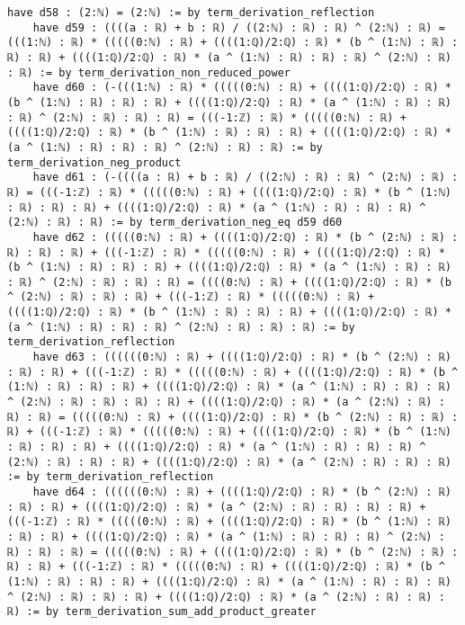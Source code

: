 \documentclass{article}
\begin{document}
\begin{tcolorbox}[colback=white!10, width=\linewidth]
\begin{lstlisting}[language=Lean4]
    have d58 : (2:ℕ) = (2:ℕ) := by term_derivation_reflection
    have d59 : ((((a : ℝ) + b : ℝ) / ((2:ℕ) : ℝ) : ℝ) ^ (2:ℕ) : ℝ) = (((1:ℕ) : ℝ) * (((((0:ℕ) : ℝ) + ((((1:ℚ)/2:ℚ) : ℝ) * (b ^ (1:ℕ) : ℝ) : ℝ) : ℝ) + ((((1:ℚ)/2:ℚ) : ℝ) * (a ^ (1:ℕ) : ℝ) : ℝ) : ℝ) ^ (2:ℕ) : ℝ) : ℝ) := by term_derivation_non_reduced_power
    have d60 : (-(((1:ℕ) : ℝ) * (((((0:ℕ) : ℝ) + ((((1:ℚ)/2:ℚ) : ℝ) * (b ^ (1:ℕ) : ℝ) : ℝ) : ℝ) + ((((1:ℚ)/2:ℚ) : ℝ) * (a ^ (1:ℕ) : ℝ) : ℝ) : ℝ) ^ (2:ℕ) : ℝ) : ℝ) : ℝ) = (((-1:ℤ) : ℝ) * (((((0:ℕ) : ℝ) + ((((1:ℚ)/2:ℚ) : ℝ) * (b ^ (1:ℕ) : ℝ) : ℝ) : ℝ) + ((((1:ℚ)/2:ℚ) : ℝ) * (a ^ (1:ℕ) : ℝ) : ℝ) : ℝ) ^ (2:ℕ) : ℝ) : ℝ) := by term_derivation_neg_product
    have d61 : (-((((a : ℝ) + b : ℝ) / ((2:ℕ) : ℝ) : ℝ) ^ (2:ℕ) : ℝ) : ℝ) = (((-1:ℤ) : ℝ) * (((((0:ℕ) : ℝ) + ((((1:ℚ)/2:ℚ) : ℝ) * (b ^ (1:ℕ) : ℝ) : ℝ) : ℝ) + ((((1:ℚ)/2:ℚ) : ℝ) * (a ^ (1:ℕ) : ℝ) : ℝ) : ℝ) ^ (2:ℕ) : ℝ) : ℝ) := by term_derivation_neg_eq d59 d60
    have d62 : (((((0:ℕ) : ℝ) + ((((1:ℚ)/2:ℚ) : ℝ) * (b ^ (2:ℕ) : ℝ) : ℝ) : ℝ) : ℝ) + (((-1:ℤ) : ℝ) * (((((0:ℕ) : ℝ) + ((((1:ℚ)/2:ℚ) : ℝ) * (b ^ (1:ℕ) : ℝ) : ℝ) : ℝ) + ((((1:ℚ)/2:ℚ) : ℝ) * (a ^ (1:ℕ) : ℝ) : ℝ) : ℝ) ^ (2:ℕ) : ℝ) : ℝ) : ℝ) = ((((0:ℕ) : ℝ) + ((((1:ℚ)/2:ℚ) : ℝ) * (b ^ (2:ℕ) : ℝ) : ℝ) : ℝ) + (((-1:ℤ) : ℝ) * (((((0:ℕ) : ℝ) + ((((1:ℚ)/2:ℚ) : ℝ) * (b ^ (1:ℕ) : ℝ) : ℝ) : ℝ) + ((((1:ℚ)/2:ℚ) : ℝ) * (a ^ (1:ℕ) : ℝ) : ℝ) : ℝ) ^ (2:ℕ) : ℝ) : ℝ) : ℝ) := by term_derivation_reflection
    have d63 : ((((((0:ℕ) : ℝ) + ((((1:ℚ)/2:ℚ) : ℝ) * (b ^ (2:ℕ) : ℝ) : ℝ) : ℝ) + (((-1:ℤ) : ℝ) * (((((0:ℕ) : ℝ) + ((((1:ℚ)/2:ℚ) : ℝ) * (b ^ (1:ℕ) : ℝ) : ℝ) : ℝ) + ((((1:ℚ)/2:ℚ) : ℝ) * (a ^ (1:ℕ) : ℝ) : ℝ) : ℝ) ^ (2:ℕ) : ℝ) : ℝ) : ℝ) : ℝ) + ((((1:ℚ)/2:ℚ) : ℝ) * (a ^ (2:ℕ) : ℝ) : ℝ) : ℝ) = (((((0:ℕ) : ℝ) + ((((1:ℚ)/2:ℚ) : ℝ) * (b ^ (2:ℕ) : ℝ) : ℝ) : ℝ) + (((-1:ℤ) : ℝ) * (((((0:ℕ) : ℝ) + ((((1:ℚ)/2:ℚ) : ℝ) * (b ^ (1:ℕ) : ℝ) : ℝ) : ℝ) + ((((1:ℚ)/2:ℚ) : ℝ) * (a ^ (1:ℕ) : ℝ) : ℝ) : ℝ) ^ (2:ℕ) : ℝ) : ℝ) : ℝ) + ((((1:ℚ)/2:ℚ) : ℝ) * (a ^ (2:ℕ) : ℝ) : ℝ) : ℝ) := by term_derivation_reflection
    have d64 : ((((((0:ℕ) : ℝ) + ((((1:ℚ)/2:ℚ) : ℝ) * (b ^ (2:ℕ) : ℝ) : ℝ) : ℝ) + ((((1:ℚ)/2:ℚ) : ℝ) * (a ^ (2:ℕ) : ℝ) : ℝ) : ℝ) : ℝ) + (((-1:ℤ) : ℝ) * (((((0:ℕ) : ℝ) + ((((1:ℚ)/2:ℚ) : ℝ) * (b ^ (1:ℕ) : ℝ) : ℝ) : ℝ) + ((((1:ℚ)/2:ℚ) : ℝ) * (a ^ (1:ℕ) : ℝ) : ℝ) : ℝ) ^ (2:ℕ) : ℝ) : ℝ) : ℝ) = (((((0:ℕ) : ℝ) + ((((1:ℚ)/2:ℚ) : ℝ) * (b ^ (2:ℕ) : ℝ) : ℝ) : ℝ) + (((-1:ℤ) : ℝ) * (((((0:ℕ) : ℝ) + ((((1:ℚ)/2:ℚ) : ℝ) * (b ^ (1:ℕ) : ℝ) : ℝ) : ℝ) + ((((1:ℚ)/2:ℚ) : ℝ) * (a ^ (1:ℕ) : ℝ) : ℝ) : ℝ) ^ (2:ℕ) : ℝ) : ℝ) : ℝ) + ((((1:ℚ)/2:ℚ) : ℝ) * (a ^ (2:ℕ) : ℝ) : ℝ) : ℝ) := by term_derivation_sum_add_product_greater

\end{lstlisting}
\end{tcolorbox}
\end{document}
